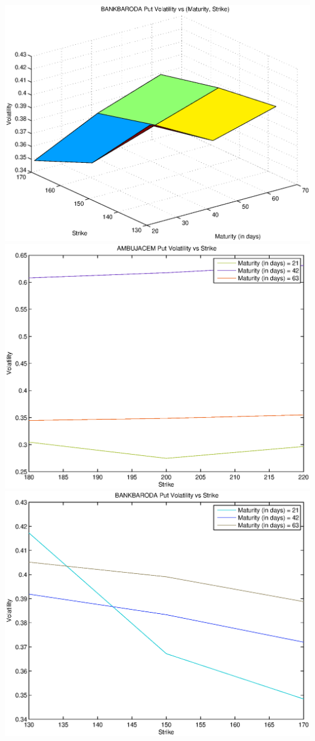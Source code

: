 \documentclass{article}
\begin{document}
\includegraphics[width=\textwidth]{BANKBARODA_Put_Volatility_vs_(Maturity,_Strike)} \\
\includegraphics[width=\textwidth]{AMBUJACEM_Put_Volatility_vs_Strike} \\                  
\includegraphics[width=\textwidth]{BANKBARODA_Put_Volatility_vs_Strike} \\
\end{document}
